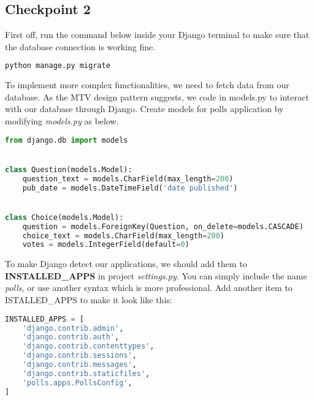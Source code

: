 \documentclass{homework}
\begin{document}
\subsection*{Checkpoint 2}
First off, run the command below inside your Django terminal to make sure that the database connection is working fine.
\begin{lstlisting}[language=bash]
python manage.py migrate
\end{lstlisting}
To implement more complex functionalities, we need to fetch data from our database. As the MTV design pattern suggests, we code in models.py to interact with our database through Django. Create models for polls application by modifying \textit{models.py} as below.
\begin{lstlisting}[language=Python]
from django.db import models


class Question(models.Model):
    question_text = models.CharField(max_length=200)
    pub_date = models.DateTimeField('date published')


class Choice(models.Model):
    question = models.ForeignKey(Question, on_delete=models.CASCADE)
    choice_text = models.CharField(max_length=200)
    votes = models.IntegerField(default=0)
\end{lstlisting}
\newpage
To make Django detect our applications, we should add them to \textbf{INSTALLED\_APPS} in project \textit{settings.py}. You can simply include the name \textit{polls}, or use another syntax which is more professional. Add another item to ISTALLED\_APPS to make it look like this:
\begin{lstlisting}[language=Python]
INSTALLED_APPS = [
    'django.contrib.admin',
    'django.contrib.auth',
    'django.contrib.contenttypes',
    'django.contrib.sessions',
    'django.contrib.messages',
    'django.contrib.staticfiles',
    'polls.apps.PollsConfig',
]
\end{lstlisting}
\end{document}
